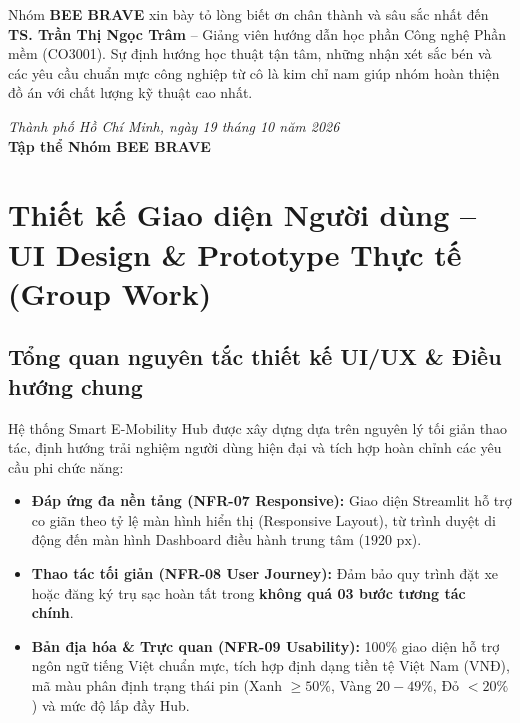 \documentclass[12pt,a4paper]{article}
\begin{document}
Nhóm \textbf{BEE BRAVE} xin bày tỏ lòng biết ơn chân thành và sâu sắc nhất đến \textbf{TS. Trần Thị Ngọc Trâm} -- Giảng viên hướng dẫn học phần Công nghệ Phần mềm (CO3001). Sự định hướng học thuật tận tâm, những nhận xét sắc bén và các yêu cầu chuẩn mực công nghiệp từ cô là kim chỉ nam giúp nhóm hoàn thiện đồ án với chất lượng kỹ thuật cao nhất.

\begin{flushright}
    \textit{Thành phố Hồ Chí Minh, ngày 19 tháng 10 năm 2026}\\[0.1cm]
    \textbf{Tập thể Nhóm BEE BRAVE}
\end{flushright}
\newpage

\section{Thiết kế Giao diện Người dùng -- UI Design \& Prototype Thực tế (Group Work)}

\subsection{Tổng quan nguyên tắc thiết kế UI/UX \& Điều hướng chung}
Hệ thống Smart E-Mobility Hub được xây dựng dựa trên nguyên lý tối giản thao tác, định hướng trải nghiệm người dùng hiện đại và tích hợp hoàn chỉnh các yêu cầu phi chức năng:
\begin{itemize}[nosep]
    \item \textbf{Đáp ứng đa nền tảng (NFR-07 Responsive):} Giao diện Streamlit hỗ trợ co giãn theo tỷ lệ màn hình hiển thị (Responsive Layout), từ trình duyệt di động đến màn hình Dashboard điều hành trung tâm ($1920\text{ px}$).
    \item \textbf{Thao tác tối giản (NFR-08 User Journey):} Đảm bảo quy trình đặt xe hoặc đăng ký trụ sạc hoàn tất trong \textbf{không quá 03 bước tương tác chính}.
    \item \textbf{Bản địa hóa \& Trực quan (NFR-09 Usability):} 100\% giao diện hỗ trợ ngôn ngữ tiếng Việt chuẩn mực, tích hợp định dạng tiền tệ Việt Nam (VNĐ), mã màu phân định trạng thái pin (Xanh $\ge 50\%$, Vàng $20-49\%$, Đỏ $<20\%$) và mức độ lấp đầy Hub.
\end{itemize}
\end{document}
